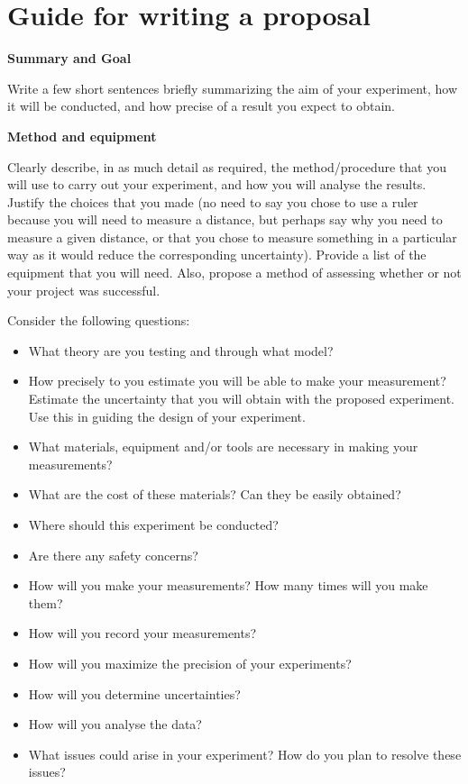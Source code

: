 \section{Guide for writing a proposal}
 \vspace{0.25cm}
\textbf{Summary and Goal}

Write a few short sentences briefly summarizing the aim of your experiment, how it will be conducted, and how precise of a result you expect to obtain.

\textbf{Method and equipment}

Clearly describe, in as much detail as required, the method/procedure that you will use to carry out your experiment, and how you will analyse the results. Justify the choices that you made (no need to say you chose to use a ruler because you will need to measure a distance, but perhaps say why you need to measure a given distance, or that you chose to measure something in a particular way as it would reduce the corresponding uncertainty). Provide a list of the equipment that you will need. Also, propose a method of assessing whether or not your project was successful. 

Consider the following questions:
\begin{itemize}
\item What theory are you testing and through what model?
\item How precisely to you estimate you will be able to make your measurement? Estimate the uncertainty that you will obtain with the proposed experiment. Use this in guiding the design of your experiment.
\item What materials, equipment and/or tools are necessary in making your measurements?
\item What are the cost of these materials? Can they be easily obtained?
\item Where should this experiment be conducted? 
\item Are there any safety concerns?
\item How will you make your measurements? How many times will you make them?
\item How will you record your measurements?
\item How will you maximize the precision of your experiments?
\item How will you determine uncertainties? 
\item How will you analyse the data?
\item What issues could arise in your experiment? How do you plan to resolve these issues?
\end{itemize}

